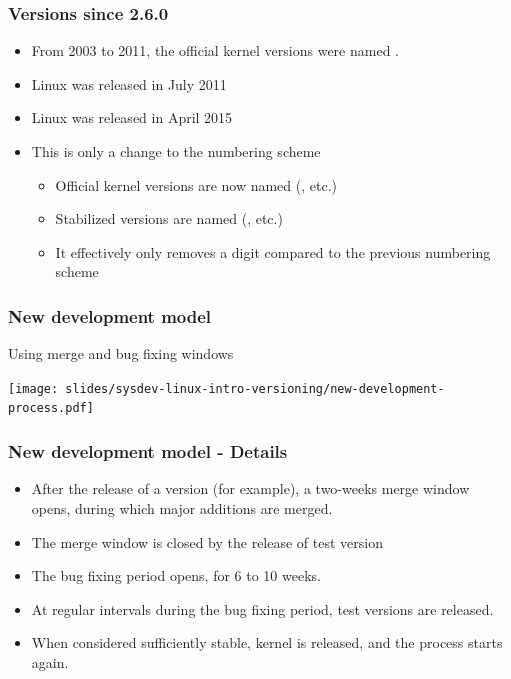 \begin{frame}
  \frametitle{Versions since 2.6.0}
  \begin{itemize}
  \item From 2003 to 2011, the official kernel versions were named .
  \item Linux  was released in July 2011
  \item Linux  was released in April 2015
  \item This is only a change to the numbering scheme
    \begin{itemize}
    \item Official kernel versions are now named 
      (, etc.)
    \item Stabilized versions are named 
      (, etc.)
    \item It effectively only removes a digit compared to the previous
      numbering scheme
    \end{itemize}
  \end{itemize}
\end{frame}

\begin{frame}
  \frametitle{New development model}
  Using merge and bug fixing windows
  \begin{center}
    \texttt{[image: slides/sysdev-linux-intro-versioning/new-development-process.pdf]}
  \end{center}
\end{frame}

\begin{frame}
  \frametitle{New development model - Details}
  \begin{itemize}
  \item After the release of a  version (for example),
    a two-weeks merge window opens, during which major additions are merged.
  \item The merge window is closed by the release of test version
  \item The bug fixing period opens, for 6 to 10 weeks.
  \item At regular intervals during the bug fixing period,
     test versions are released.
  \item When considered sufficiently stable, kernel 
    is released, and the process starts again.
  \end{itemize}
\end{frame}

